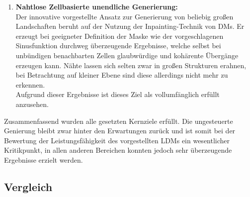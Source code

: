 \begin{enumerate}
    \item \textbf {Nahtlose Zellbasierte unendliche Generierung:} \\
    Der innovative vorgestellte Ansatz zur Generierung von beliebig großen Landschaften beruht auf der Nutzung der Inpainting-Technik von \ac{DM}s. Er erzeugt bei geeigneter Definition der Maske wie der vorgeschlagenen Sinusfunktion durchweg überzeugende Ergebnisse, welche selbst bei unbündigen benachbarten Zellen glaubwürdige und kohärente Übergänge erzeugen kann. Nähte lassen sich selten zwar in großen Strukturen erahnen, bei Betrachtung auf kleiner Ebene sind diese allerdings nicht mehr zu erkennen. \\
    Aufgrund dieser Ergebnisse ist dieses Ziel als vollumfänglich erfüllt anzusehen.     

\end{enumerate}
Zusammenfassend wurden alle gesetzten Kernziele erfüllt. Die ungesteuerte Genierung bleibt zwar hinter den Erwartungen zurück und ist somit bei der Bewertung der Leistungsfähigkeit des vorgestellten \ac{LDM}s ein wesentlicher Kritikpunkt, in allen anderen Bereichen konnten jedoch sehr überzeugende Ergebnisse erzielt werden. 
 
\subsection{Vergleich}

